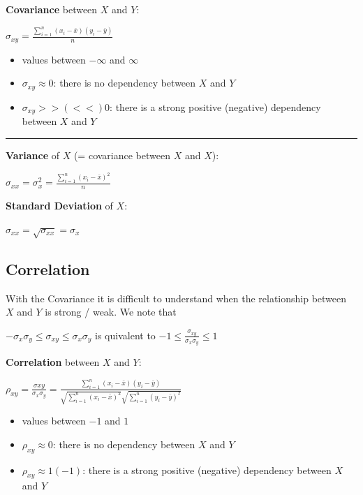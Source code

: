 \documentclass[]{article}
\providecommand{\tightlist}{%
  \setlength{\itemsep}{0pt}\setlength{\parskip}{0pt}}
\begin{document}
\textbf{Covariance} between \(X\) and \(Y\):

\(\sigma_{xy}=\frac{\sum_{i=1} ^ n (x_i- \bar{x}) (y_i- \bar{y} )}{n}\)

\begin{itemize}
\tightlist
\item
  values between \(- \infty\) and \(\infty\)\\
\item
  \(\sigma_{xy} \approx 0\): there is no dependency between \(X\) and
  \(Y\)\\
\item
  \(\sigma_{xy} >> (<<) 0\): there is a strong positive (negative)
  dependency between \(X\) and \(Y\)
\end{itemize}

\begin{center}\rule{0.5\linewidth}{\linethickness}\end{center}

\textbf{Variance} of \(X\) (= covariance between \(X\) and \(X\)):

\(\sigma_{xx}=\sigma_{x} ^ 2= \frac{\sum_{i=1} ^ n (x_i- \bar{x}) ^ 2}{n}\)

\textbf{Standard Deviation} of \(X\):

\(\sigma_{xx}=\sqrt{\sigma_{xx}}=\sigma_{x}\)

\subsection{Correlation}\label{correlation}

With the Covariance it is difficult to understand when the relationship
between \(X\) and \(Y\) is strong / weak. We note that

\(- \sigma_{x} \sigma_{y} \leq \sigma_{xy} \leq \sigma_{x} \sigma_{y}\)
is quivalent to
\(-1 \leq \frac{\sigma_{xy}}{\sigma_{x} \sigma_{y}} \leq 1\)

\textbf{Correlation} between \(X\) and \(Y\):

\(\rho_{xy}=\frac{\sigma{xy}}{\sigma_{x} \sigma_{y}} = \frac{\sum_{i=1} ^ n (x_i- \bar{x}) (y_i- \bar{y})}{\sqrt{\sum_{i=1} ^ n (x_i- \bar{ x}) ^ 2} \sqrt{\sum_{i=1} ^ n (y_i- \bar{y}) ^ 2}}\)

\begin{itemize}
\tightlist
\item
  values between \(-1\) and \(1\)
\item
  \(\rho_{xy} \approx 0\): there is no dependency between \(X\) and
  \(Y\)
\item
  \(\rho_{xy} \approx 1 (-1)\): there is a strong positive (negative)
  dependency between \(X\) and \(Y\)
\end{itemize}
\end{document}
